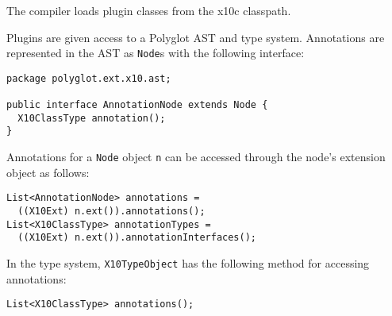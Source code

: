 The compiler loads plugin classes from the x10c classpath.

Plugins are given access to a Polyglot AST and type system.  Annotations are
represented in the AST as \texttt{Node}s with the following interface:

\begin{verbatim}
package polyglot.ext.x10.ast;

public interface AnnotationNode extends Node {
  X10ClassType annotation();
}
\end{verbatim}

Annotations for a \texttt{Node} object \texttt{n} can be accessed through the
node's extension object as follows:

\begin{verbatim}
List<AnnotationNode> annotations =
  ((X10Ext) n.ext()).annotations();
List<X10ClassType> annotationTypes =
  ((X10Ext) n.ext()).annotationInterfaces();
\end{verbatim}
In the type system, \texttt{X10TypeObject} has the following
method for accessing annotations:
\begin{verbatim}
List<X10ClassType> annotations();
\end{verbatim}






